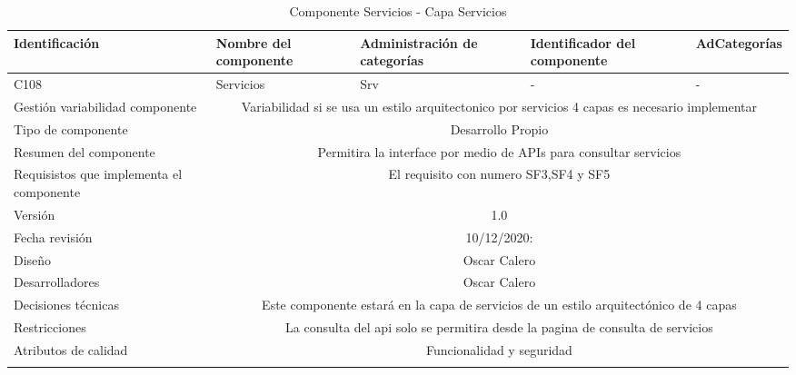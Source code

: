 \documentclass[10pt,a4paper,openany]{book}
\begin{document}
\begin{longtable}{|p{3cm}|p{3cm}|p{3cm}|p{3cm}|p{3cm}|} \hline
Identificación & Nombre del componente & Administración de categorías & Identificador del componente & AdCategorías \\[0.5ex] \hline
C108& Servicios& Srv& -& -\\[0.5ex] \hline
Gestión variabilidad componente & \multicolumn{4}{|c|}{Variabilidad si se usa un estilo arquitectonico por servicios 4 capas es necesario implementar} \\ \hline
Tipo de componente & \multicolumn{4}{|c|}{Desarrollo Propio} \\ \hline
Resumen del componente & \multicolumn{4}{|c|}{Permitira la interface por medio de APIs para consultar servicios} \\ \hline
Requisistos que implementa el componente & \multicolumn{4}{|c|}{El requisito con numero SF3,SF4 y SF5 } \\ \hline
Versión & \multicolumn{4}{|c|}{1.0 } \\ \hline
Fecha revisión & \multicolumn{4}{|c|}{ 10/12/2020:} \\ \hline
Diseño & \multicolumn{4}{|c|}{Oscar Calero} \\ \hline
Desarrolladores & \multicolumn{4}{|c|}{Oscar Calero} \\ \hline
Decisiones técnicas & \multicolumn{4}{|c|}{Este componente estará en la capa de servicios de un estilo arquitectónico de 4 capas  } \\ \hline
Restricciones & \multicolumn{4}{|c|}{La consulta del api solo se permitira desde la pagina de consulta de servicios} \\ \hline
Atributos de calidad & \multicolumn{4}{|c|}{Funcionalidad y seguridad} \\ \hline
\caption{Componente Servicios - Capa Servicios}
\label{table:t6}
\end{longtable}
\end{document}
